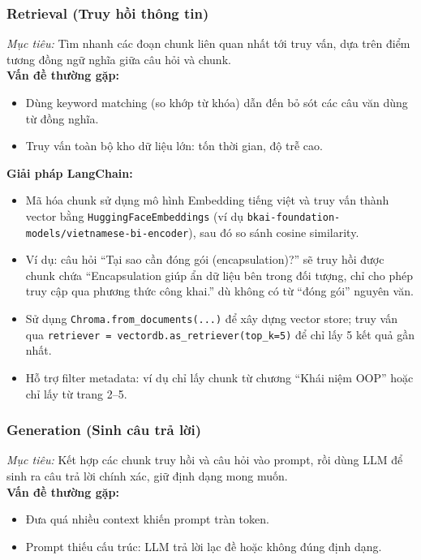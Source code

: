 \documentclass[11pt]{article}
\begin{document}
\subsubsection{Retrieval (Truy hồi thông tin)}
\textit{Mục tiêu:} Tìm nhanh các đoạn chunk liên quan nhất tới truy vấn, dựa trên điểm tương đồng ngữ nghĩa giữa câu hỏi và chunk. \\

\noindent \textbf{Vấn đề thường gặp:}\\
\begin{itemize}
    \item Dùng keyword matching (so khớp từ khóa) dẫn đến bỏ sót các câu văn dùng từ đồng nghĩa.
    \item Truy vấn toàn bộ kho dữ liệu lớn: tốn thời gian, độ trễ cao.
\end{itemize}

\noindent \textbf{Giải pháp LangChain:}\\
\begin{itemize}
    \item Mã hóa chunk sử dụng mô hình Embedding tiếng việt và truy vấn thành vector bằng \texttt{HuggingFaceEmbeddings} (ví dụ \texttt{bkai-foundation-models/vietnamese-bi-encoder}), sau đó so sánh cosine similarity.
    \item Ví dụ: câu hỏi “Tại sao cần đóng gói (encapsulation)?” sẽ truy hồi được chunk chứa “Encapsulation giúp ẩn dữ liệu bên trong đối tượng, chỉ cho phép truy cập qua phương thức công khai.” dù không có từ “đóng gói” nguyên văn.
    \item Sử dụng \texttt{Chroma.from\_documents(...)} để xây dựng vector store; truy vấn qua \texttt{retriever = vectordb.as\_retriever(top\_k=5)} để chỉ lấy 5 kết quả gần nhất.
    \item Hỗ trợ filter metadata: ví dụ chỉ lấy chunk từ chương “Khái niệm OOP” hoặc chỉ lấy từ trang 2–5.
\end{itemize}

\subsubsection{Generation (Sinh câu trả lời)}

\textit{Mục tiêu:} Kết hợp các chunk truy hồi và câu hỏi vào prompt, rồi dùng LLM để sinh ra câu trả lời chính xác, giữ định dạng mong muốn.\\

\noindent \textbf{Vấn đề thường gặp:}\\
\begin{itemize}
    \item Đưa quá nhiều context khiến prompt tràn token.
    \item Prompt thiếu cấu trúc: LLM trả lời lạc đề hoặc không đúng định dạng.
\end{itemize}
\end{document}

